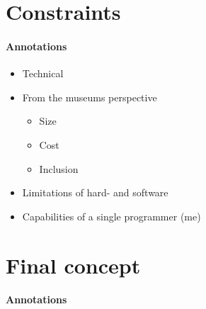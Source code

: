 
%


\section{Constraints}
\label{conception_constraints}

\paragraph{Annotations}

\begin{itemize}
	\item Technical
	\item From the museums perspective
	\begin{itemize}
		\item Size
		\item Cost
		\item Inclusion
	\end{itemize}
	\item Limitations of hard- and software
	\item Capabilities of a single programmer (me)
\end{itemize}


\section{Final concept}
\label{conception_final}

\paragraph{Annotations}


